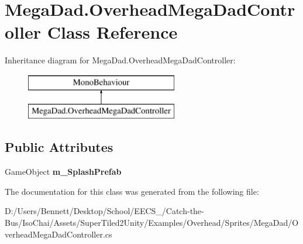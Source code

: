 \hypertarget{class_mega_dad_1_1_overhead_mega_dad_controller}{}\section{Mega\+Dad.\+Overhead\+Mega\+Dad\+Controller Class Reference}
\label{class_mega_dad_1_1_overhead_mega_dad_controller}
Inheritance diagram for Mega\+Dad.\+Overhead\+Mega\+Dad\+Controller\+:\begin{figure}[H]
\begin{center}
\leavevmode
\includegraphics[height=2.000000cm]{class_mega_dad_1_1_overhead_mega_dad_controller}
\end{center}
\end{figure}
\subsection*{Public Attributes}
\begin{DoxyCompactItemize}
\item 
\mbox{\label{class_mega_dad_1_1_overhead_mega_dad_controller_a23eb24c51bc53a510be8f79cb0df9a87}} 
Game\+Object {\bfseries m\+\_\+\+Splash\+Prefab}
\end{DoxyCompactItemize}


The documentation for this class was generated from the following file\+:\begin{DoxyCompactItemize}
\item 
D\+:/\+Users/\+Bennett/\+Desktop/\+School/\+E\+E\+C\+S\+\_/\+Catch-\/the-\/\+Bus/\+Iso\+Chai/\+Assets/\+Super\+Tiled2\+Unity/\+Examples/\+Overhead/\+Sprites/\+Mega\+Dad/Overhead\+Mega\+Dad\+Controller.\+cs\end{DoxyCompactItemize}
